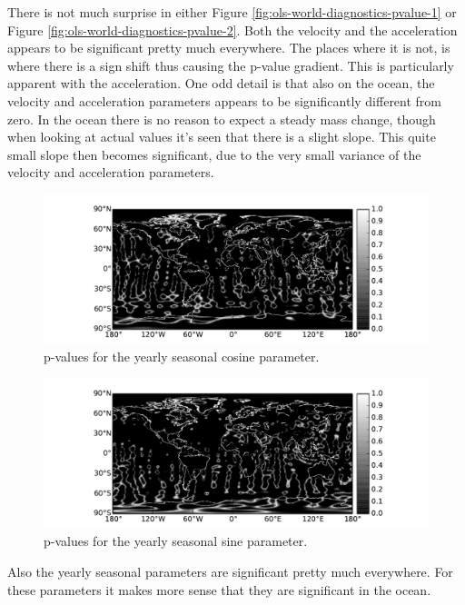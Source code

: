 There is not much surprise in either Figure \ref{fig:ols-world-diagnostics-pvalue-1} or Figure \ref{fig:ols-world-diagnostics-pvalue-2}. Both the velocity and the acceleration appears to be significant pretty much everywhere. The places where it is not, is where there is a sign shift thus causing the p-value gradient. This is particularly apparent with the acceleration. One odd detail is that also on the ocean, the velocity and acceleration parameters appears to be significantly different from zero. In the ocean there is no reason to expect a steady mass change, though when looking at actual values it's seen that there is a slight slope. This quite small slope then becomes significant, due to the very small variance of the velocity and acceleration parameters. 

\begin{figure}[H]
	\centering
	\includegraphics[width=\textwidth]{figures/ols-world-diagnostics-pvalue-3}
	\caption{p-values for the yearly seasonal cosine parameter.}
	\label{fig:ols-world-diagnostics-pvalue-3}
\end{figure}

\begin{figure}[H]
	\centering
	\includegraphics[width=\textwidth]{figures/ols-world-diagnostics-pvalue-4}
	\caption{p-values for the yearly seasonal sine parameter.}
	\label{fig:ols-world-diagnostics-pvalue-4}
\end{figure}

Also the yearly seasonal parameters are significant pretty much everywhere. For these parameters it makes more sense that they are significant in the ocean.

